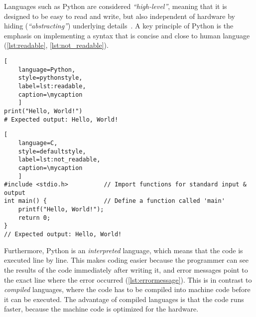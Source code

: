 Languages such as Python are considered \textit{``high-level''}, meaning
that it is designed to be easy to read and write, but also independent of
hardware by hiding (\textit{``abstracting''}) underlying
details~\cite{PythonLanguageReference2024}. A key principle of Python is the
emphasis on implementing a syntax that is concise and close to human language
(\autoref{lst:readable}, \autoref{lst:not_readable}).

\def\mycaption{ Example of
    readable Python code. This one-line code returns the words (string)
    \texttt{"Hello, World!"} when executed. The command is straightforward and easy
    to understand.}
\begin{lstlisting}[
    language=Python, 
    style=pythonstyle,
    label=lst:readable,
    caption=\mycaption
    ]
print("Hello, World!")
# Expected output: Hello, World!
\end{lstlisting}

\def\mycaption{ Example of less readable code written in the low-level
    programming language C. This code is doing exactly the same as the Python
    code in \autoref{lst:readable}, but is harder to understand because more
    steps are needed, including the import of a library \texttt{stdio.h} and the
    definition of a function called \texttt{main}. Note that C uses \texttt{//}
    to begin comment sections.}
\begin{lstlisting}[
    language=C, 
    style=defaultstyle,
    label=lst:not_readable, 
    caption=\mycaption
    ]
#include <stdio.h>          // Import functions for standard input & output
int main() {                // Define a function called 'main'
    printf("Hello, World!");
    return 0;
}
// Expected output: Hello, World!
\end{lstlisting}

Furthermore, Python is an \textit{interpreted} language, which means that the
code is executed line by line. This makes coding easier because the programmer
can see the results of the code immediately after writing it, and error messages
point to the exact line where the error occurred (\autoref{lst:errormessage}).
This is in contrast to \textit{compiled} languages, where the code has to be
compiled into machine code before it can be executed. The advantage of compiled
languages is that the code runs faster, because the machine code is optimized
for the hardware.


